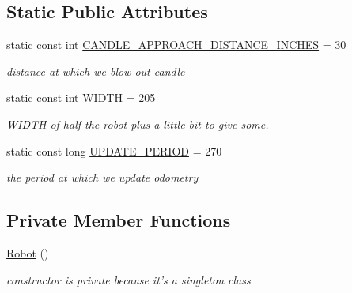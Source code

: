 \subsection*{Static Public Attributes}
\begin{DoxyCompactItemize}
\item 
static const int \hyperlink{classRobot_a59c0d01f9863b7c1e504b558bd9fae67}{C\-A\-N\-D\-L\-E\-\_\-\-A\-P\-P\-R\-O\-A\-C\-H\-\_\-\-D\-I\-S\-T\-A\-N\-C\-E\-\_\-\-I\-N\-C\-H\-E\-S} = 30
\begin{DoxyCompactList}\small\item\em distance at which we blow out candle \end{DoxyCompactList}\item 
static const int \hyperlink{classRobot_aeefc61d76e6ba024e4af9c844715a84d}{W\-I\-D\-T\-H} = 205
\begin{DoxyCompactList}\small\item\em W\-I\-D\-T\-H of half the robot plus a little bit to give some. \end{DoxyCompactList}\item 
static const long \hyperlink{classRobot_a6a76c7da686c2cec0cba2877e0c914dc}{U\-P\-D\-A\-T\-E\-\_\-\-P\-E\-R\-I\-O\-D} = 270
\begin{DoxyCompactList}\small\item\em the period at which we update odometry \end{DoxyCompactList}\end{DoxyCompactItemize}
\subsection*{Private Member Functions}
\begin{DoxyCompactItemize}
\item 
\hyperlink{classRobot_a4fc7c70ae20623f05e06f2ecb388b6c4}{Robot} ()
\begin{DoxyCompactList}\small\item\em constructor is private because it's a singleton class \end{DoxyCompactList}\end{DoxyCompactItemize}
